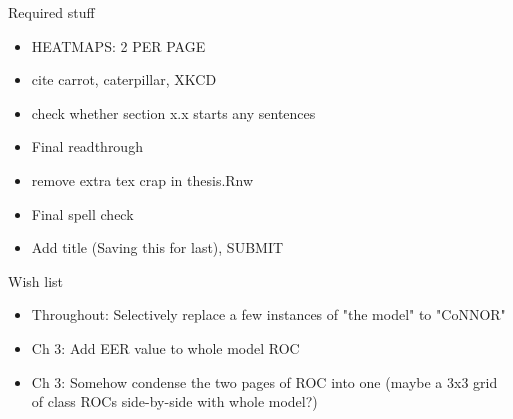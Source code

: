 
Required stuff

\begin{itemize}
\item HEATMAPS: 2 PER PAGE
\item cite carrot, caterpillar, XKCD
\item check whether section x.x starts any sentences
\item Final readthrough
\item remove extra tex crap in thesis.Rnw
\item Final spell check
\item Add title (Saving this for last), SUBMIT
\end{itemize}



Wish list

\begin{itemize}
\item Throughout: Selectively replace a few instances of "the model" to "CoNNOR"
\item Ch 3: Add EER value to whole model ROC
\item Ch 3: Somehow condense the two pages of ROC into one (maybe a 3x3 grid of class ROCs side-by-side with whole model?)
\end{itemize}


